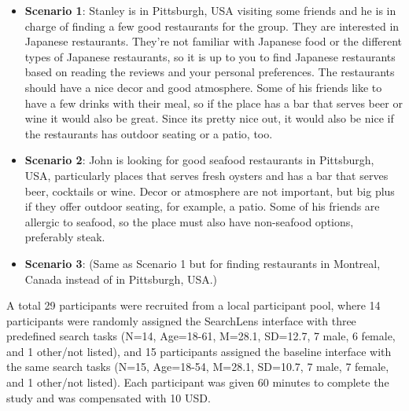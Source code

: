 \documentclass{sigchi}
\begin{document}
\begin{itemize}
  
  
    \item \textbf{Scenario 1}: Stanley is in Pittsburgh, USA visiting some friends and he is in charge of finding a few good restaurants for the group. They are interested in Japanese restaurants. They're not familiar with Japanese food or the different types of Japanese restaurants, so it is up to you to find Japanese restaurants based on reading the reviews and your personal preferences. The restaurants should have a nice decor and good atmosphere. Some of his friends like to have a few drinks with their meal, so if the place has a bar that serves beer or wine it would also be great. Since its pretty nice out, it would also be nice if the restaurants has outdoor seating or a patio, too.
    
    \item \textbf{Scenario 2}: John is looking for good seafood restaurants in Pittsburgh, USA, particularly places that serves fresh oysters and has a bar that serves beer, cocktails or wine. Decor or atmosphere are not important, but big plus if they offer outdoor seating, for example, a patio. Some of his friends are allergic to seafood, so the place must also have non-seafood options, preferably steak.
    
    \item \textbf{Scenario 3}: (Same as Scenario 1 but for finding restaurants in Montreal, Canada instead of in Pittsburgh, USA.)
\end{itemize}

A total 29 participants were recruited from a local participant pool, where 14 participants were randomly assigned the SearchLens interface with three predefined search tasks (N=14, Age=18-61, M=28.1, SD=12.7, 7 male, 6 female, and 1 other/not listed), and 15 participants assigned the baseline interface with the same search tasks (N=15, Age=18-54, M=28.1, SD=10.7, 7 male, 7 female, and 1 other/not listed). Each participant was given 60 minutes to complete the study and was compensated with 10 USD. 




\end{document}
